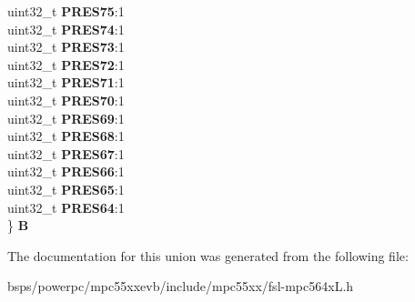 \begin{DoxyCompactItemize}
\begin{tabbing}
\>uint32\_t {\bfseries PRES75}:1\\
\>uint32\_t {\bfseries PRES74}:1\\
\>uint32\_t {\bfseries PRES73}:1\\
\>uint32\_t {\bfseries PRES72}:1\\
\>uint32\_t {\bfseries PRES71}:1\\
\>uint32\_t {\bfseries PRES70}:1\\
\>uint32\_t {\bfseries PRES69}:1\\
\>uint32\_t {\bfseries PRES68}:1\\
\>uint32\_t {\bfseries PRES67}:1\\
\>uint32\_t {\bfseries PRES66}:1\\
\>uint32\_t {\bfseries PRES65}:1\\
\>uint32\_t {\bfseries PRES64}:1\\
\} {\bfseries B}\\

\end{tabbing}\end{DoxyCompactItemize}


The documentation for this union was generated from the following file\+:\begin{DoxyCompactItemize}
\item 
bsps/powerpc/mpc55xxevb/include/mpc55xx/fsl-\/mpc564x\+L.\+h\end{DoxyCompactItemize}

